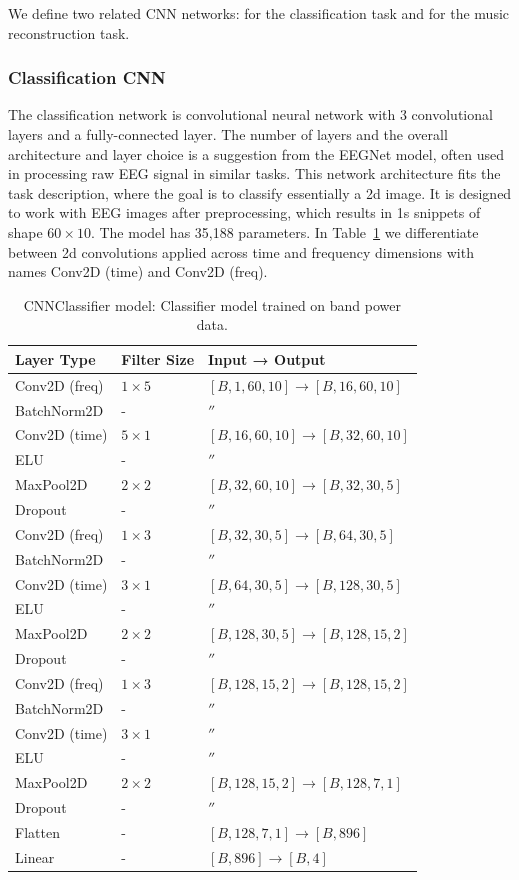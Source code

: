 We define two related CNN networks: for the classification task and for the music reconstruction task.

\subsubsection{Classification CNN}

The classification network is convolutional neural network\cite{cite-cnn} with 3 convolutional layers and a fully-connected layer.
The number of layers and the overall architecture and layer choice is a suggestion from the EEGNet\cite{eegnet} model, often used in processing raw EEG signal in similar tasks.
This network architecture fits the task description, where the goal is to classify essentially a 2d image.
It is designed to work with EEG images after preprocessing, which results in 1s snippets of shape \( 60\times 10\).
The model has 35,188 parameters. 
In Table~\ref{tab:cnn-layers} we differentiate between 2d convolutions applied across time and frequency dimensions with names Conv2D (time) and Conv2D (freq).

\begin{table}[h]
\centering
\footnotesize
\begin{tabular}{l|ll}
\hline
\textbf{Layer Type} & \textbf{Filter Size} & \textbf{Input → Output} \\
\hline
Conv2D (freq) & $1 \times 5$ & $[B, 1, 60, 10] \to [B, 16, 60, 10]$ \\
BatchNorm2D & - & $''$ \\
Conv2D (time) & $5 \times 1$ & $[B, 16, 60, 10] \to [B, 32, 60, 10]$ \\
ELU & - & $''$ \\
MaxPool2D & $2 \times 2$ & $[B, 32, 60, 10] \to [B, 32, 30, 5]$ \\
Dropout & - & $''$ \\
\hline
Conv2D (freq) & $1 \times 3$ & $[B, 32, 30, 5] \to [B, 64, 30, 5]$ \\
BatchNorm2D & - & $''$ \\
Conv2D (time) & $3 \times 1$ & $[B, 64, 30, 5] \to [B, 128, 30, 5]$ \\
ELU & - & $''$ \\
MaxPool2D & $2 \times 2$ & $[B, 128, 30, 5] \to [B, 128, 15, 2]$ \\
Dropout & - & $''$ \\
\hline
Conv2D (freq) & $1 \times 3$ & $[B, 128, 15, 2] \to [B, 128, 15, 2]$ \\
BatchNorm2D & - & $''$ \\
Conv2D (time) & $3 \times 1$ & $''$ \\
ELU & - & $''$ \\
MaxPool2D & $2 \times 2$ & $[B, 128, 15, 2] \to [B, 128, 7, 1]$ \\
Dropout & - & $''$ \\
\hline
Flatten & - & $[B, 128, 7, 1] \to [B, 896]$ \\
Linear & - & $[B, 896] \to [B, 4]$ \\
\hline
\end{tabular}
\caption{CNNClassifier model: Classifier model trained on band power data.}
\label{tab:cnn-layers}
\end{table}

